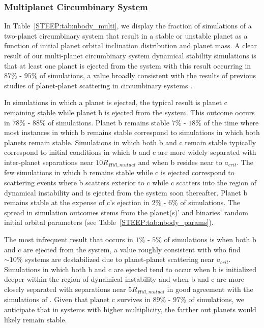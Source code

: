 \subsubsection{Multiplanet Circumbinary System}

In Table~\ref{STEEP:tab:nbody_multi}, we display the fraction of simulations of a two-planet circumbinary system that result in a stable or unstable planet as a function of initial planet orbital inclination distribution and planet mass. A clear result of our multi-planet circumbinary system dynamical stability simulations is that at least one planet is ejected from the system with this result occurring in $87\%$ - $95\%$ of simulations, a value broadly consistent with the results of previous studies of planet-planet scattering in circumbinary systems \citep[e.g.][]{Sutherland2016,Smullen2016,Gong2017,Gong2017b}. 

In simulations in which a planet is ejected, the typical result is planet c remaining stable while planet b is ejected from the system.  This outcome occurs in $78\%$ - $88\%$ of simulations.  Planet b remains stable $7\%$ - $18\%$ of the time where most instances in which b remains stable correspond to simulations in which both planets remain stable.  Simulations in which both b and c remain stable typically correspond to initial conditions in which b and c are more widely separated with inter-planet separations near $10 R_{Hill,mutual}$ and when b resides near to $a_{crit}$.  The few simulations in which b remains stable while c is ejected correspond to scattering events where b scatters exterior to c while c scatters into the region of dynamical instability and is ejected from the system soon thereafter.  Planet b remains stable at the expense of c's ejection in $2\%$ - $6\%$ of simulations.  The spread in simulation outcomes stems from the planet(s)' and binaries' random initial orbital parameters (see Table~\ref{STEEP:tab:nbody_params}).

The most infrequent result that occurs in $1\%$ - $5\%$ of simulations is when both b and c are ejected from the system, a value roughly consistent with \citet{Gong2017b} who find ${\sim 10\%}$ systems are destabilized due to planet-planet scattering near $a_{crit}$.  Simulations in which both b and c are ejected tend to occur when b is initialized deeper within the region of dynamical instability and when b and c are more closely separated with separations near $5 R_{Hill,mutual}$ in good agreement with the simulations of \citet{Kratter2014}.  Given that planet c survives in $89\%$ - $97\%$ of simulations, we anticipate that in systems with higher multiplicity, the farther out planets would likely remain stable.

